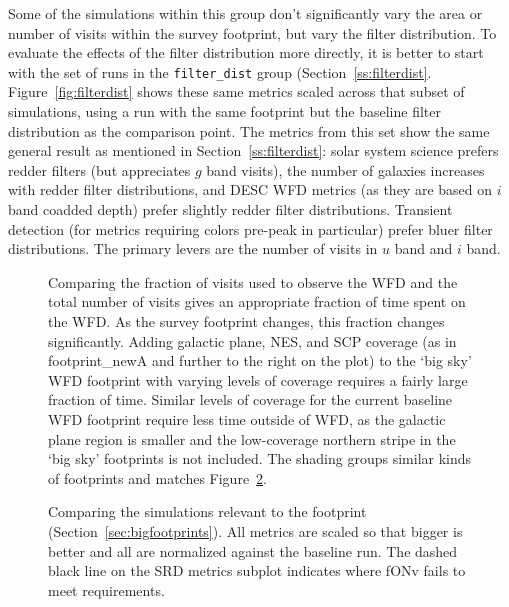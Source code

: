 Some of the simulations within this group don't significantly vary the area or number of visits within the survey footprint, but vary the filter distribution. To evaluate the effects of the filter distribution more directly, it is better to start with the set of runs in the {\tt filter\_dist} group (Section~\ref{ss:filterdist}. Figure~\ref{fig:filterdist} shows these same metrics scaled across that subset of simulations, using a run with the same footprint but the baseline filter distribution as the comparison point. The metrics from this set show the same general result as mentioned in Section~\ref{ss:filterdist}: solar system science prefers redder filters (but appreciates $g$ band visits), the number of galaxies increases with redder filter distributions, and DESC WFD metrics (as they are based on $i$ band coadded depth) prefer slightly redder filter distributions. Transient detection (for metrics requiring colors pre-peak in particular) prefer bluer filter distributions. The primary levers are the number of visits in $u$ band and $i$ band. 


\begin{figure}
\caption{Comparing the fraction of visits used to observe the WFD and the total number of visits gives an appropriate fraction of time spent on the WFD. As the survey footprint changes, this fraction changes significantly. Adding galactic plane, NES, and SCP coverage (as in footprint\_newA and further to the right on the plot) to the `big sky' WFD footprint with varying levels of coverage requires a fairly large fraction of time. Similar levels of coverage for the current baseline WFD footprint require less time outside of WFD, as the galactic plane region is smaller and the low-coverage northern stripe in the `big sky' footprints  is not included. The shading groups similar kinds of footprints and matches Figure~\ref{fig:footprint}.}
\label{fig:footprint_wfdfraction}
\end{figure}

\begin{figure}
\caption{Comparing the simulations relevant to the footprint (Section~\ref{sec:bigfootprints}). All metrics are scaled so that bigger is better and all are normalized against the baseline run. The dashed black line on the SRD metrics subplot indicates where fONv fails to meet requirements.}
\label{fig:footprint}
\end{figure}

